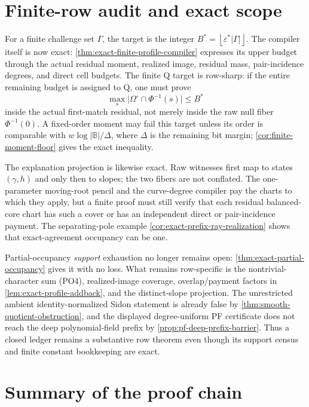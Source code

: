 \documentclass[12pt,a4paper]{amsart}
\numberwithin{equation}{section}
\theoremstyle{remark}
\newcommand{\B}{\mathbb B}
\newcommand{\eps}{\varepsilon}
\newcommand{\Omc}{\Omega^{\circ}}
\newcommand{\abs}[1]{\lvert #1\rvert}
\newcommand{\floor}[1]{\left\lfloor #1\right\rfloor}
\begin{document}
\section{Finite-row audit and exact scope}\label{sec:finite-scope}

For a finite challenge set \(\Gamma\), the target is the integer
\(B^{\ast}=\floor{\eps^{\ast}\abs\Gamma}\).  The compiler itself is now
exact: \cref{thm:exact-finite-profile-compiler} expresses its upper budget
through the actual residual moment, realized image, residual mass,
pair-incidence degrees, and direct cell budgets.  The finite Q target is
row-sharp: if the entire remaining budget is assigned to Q, one must prove
\[
        \max_s\abs{\Omc\cap\Phi^{-1}(s)}\le B^{\ast}
\]
inside the actual first-match residual, not merely inside the raw null
fiber \(\Phi^{-1}(0)\).  A fixed-order moment may fail this target unless
its order is comparable with \(w\log\abs\B/\Delta\), where \(\Delta\) is
the remaining bit margin; \cref{cor:finite-moment-floor} gives the exact
inequality.

The explanation projection is likewise exact.  Raw witnesses first map to
states \((\gamma,h)\) and only then to slopes; the two fibers are not
conflated.  The one-parameter moving-root pencil and the curve-degree
compiler pay the charts to which they apply, but a finite proof must still
verify that each residual balanced-core chart has such a cover or has an
independent direct or pair-incidence payment.  The separating-pole example
\cref{cor:exact-prefix-ray-realization} shows that exact-agreement
occupancy can be one.

Partial-occupancy \emph{support} exhaustion no longer remains open:
\cref{thm:exact-partial-occupancy} gives it with no loss.  What remains
row-specific is the nontrivial-character sum \textup{(PO4)}, realized-image
coverage, overlap/payment factors in \cref{lem:exact-profile-addback}, and
the distinct-slope projection.  The unrestricted ambient
identity-normalized Sidon statement is already false by
\cref{thm:smooth-quotient-obstruction}, and the displayed
degree-uniform PF certificate does not reach the deep polynomial-field
prefix by \cref{prop:pf-deep-prefix-barrier}.  Thus a closed ledger remains
a substantive row theorem even though its support census and finite
constant bookkeeping are exact.

\section{Summary of the proof chain}\label{sec:summary}
\end{document}
